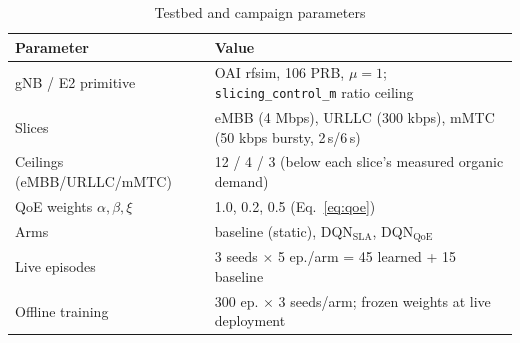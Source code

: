\begin{table}[t]
\centering
\caption{Testbed and campaign parameters}
\label{tab:params}
\small
\begin{tabular}{@{}lp{4.6cm}@{}}
\toprule
\textbf{Parameter} & \textbf{Value} \\
\midrule
gNB / E2 primitive & OAI rfsim, 106 PRB, $\mu{=}1$; \texttt{slicing\_control\_m} ratio ceiling \\
Slices & eMBB (4 Mbps), URLLC (300 kbps), mMTC (50 kbps bursty, 2\,s/6\,s) \\
Ceilings (eMBB/URLLC/mMTC) & 12 / 4 / 3 (below each slice's measured organic demand) \\
QoE weights $\alpha,\beta,\xi$ & 1.0, 0.2, 0.5 (Eq.~\ref{eq:qoe}) \\
Arms & baseline (static), DQN$_{\text{SLA}}$, DQN$_{\text{QoE}}$ \\
Live episodes & 3 seeds $\times$ 5 ep./arm = 45 learned + 15 baseline \\
Offline training & 300 ep. $\times$ 3 seeds/arm; frozen weights at live deployment \\
\bottomrule
\end{tabular}
\end{table}
